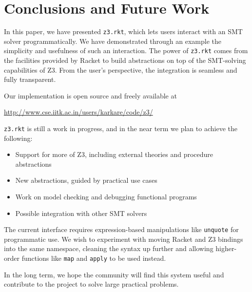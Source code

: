 \section{Conclusions and Future Work}

In this paper, we have presented \texttt{z3.rkt}, which lets users interact with
an SMT solver programmatically. We have demonstrated through an example the
simplicity and usefulness of such an interaction. The power of \texttt{z3.rkt}
comes from the facilities provided by Racket to build abstractions on top of the
SMT-solving capabilities of Z3. From the user's perspective, the integration is
seamless and fully transparent.

Our implementation is open source and freely available at
\begin{center}
\url{http://www.cse.iitk.ac.in/users/karkare/code/z3/}
\end{center}

\texttt{z3.rkt} is still a work in progress, and in the near term we plan to
achieve the following:

\begin{itemize}
\item Support for more of Z3, including external theories and procedure
  abstractions
\item New abstractions, guided by practical use cases
\item Work on model checking and debugging functional programs
\item Possible integration with other SMT solvers
\end{itemize}

The current interface requires expression-based manipulations like
\texttt{unquote} for programmatic use. We wish to experiment with moving Racket
and Z3 bindings into the same namespace, cleaning the syntax up further and
allowing higher-order functions like \texttt{map} and \texttt{apply} to be used
instead.

In the long term, we hope the community will find this system useful and
contribute to the project to solve large practical problems.

